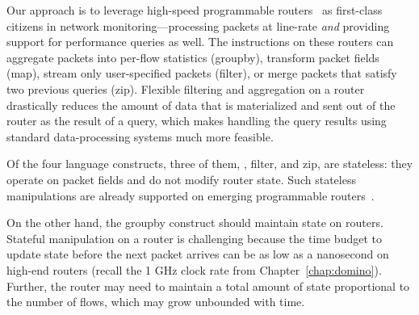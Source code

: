 Our approach is to leverage high-speed programmable routers~\cite{rmt, xpliant,
  tofino, flexpipe} as first-class citizens in network monitoring---processing
packets at line-rate {\em and} providing support for performance queries as well.
The instructions on these routers can aggregate packets into per-flow
statistics ({\ct groupby}), transform packet fields ({\ct map}), stream only
user-specified packets ({\ct filter}), or merge packets that satisfy two
previous queries ({\ct zip}). Flexible filtering and aggregation on a router
drastically reduces the amount of data that is materialized and sent out of the
router as the result of a query, which makes handling the query results using
standard data-processing systems much more feasible.

Of the four language constructs, three of them, , {\ct filter}, and
{\ct zip}, are stateless: they operate on packet fields and do not modify router
state. Such stateless manipulations are already supported on emerging
programmable routers~\cite{rmt, xpliant, flexpipe, tofino}.

On the other hand, the {\ct groupby} construct should maintain state on routers.
Stateful manipulation on a router is challenging because the time budget to
update state before the next packet arrives can be as low as a nanosecond on
high-end routers (recall the 1 GHz clock rate from Chapter~\ref{chap:domino}).
Further, the router may need to maintain a total amount of state proportional
to the number of flows, which may grow unbounded with time.

